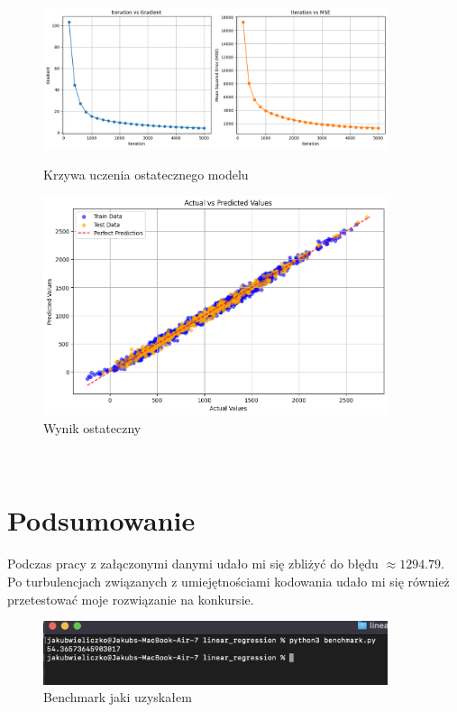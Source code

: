 \documentclass[polish,12pt,a4paper]{extarticle}
\begin{document}
\begin{figure}[h!]
    \centering
    \begin{minipage}[b]{0.48\textwidth}
    \includegraphics[width=0.9\textwidth]{data/finlc.png}
    \caption{Krzywa uczenia ostatecznego modelu}
    \end{minipage} \hspace{}
    \begin{minipage}[b]{0.48\textwidth}
    \includegraphics[width=0.9\textwidth]{data/finadjust.png}
    \caption{Wynik ostateczny}
    \end{minipage}
\end{figure} \\


\section*{Podsumowanie}
Podczas pracy z załączonymi danymi udało mi się zbliżyć do błędu $\approx 1294.79$. Po turbulencjach związanych z umiejętnościami kodowania udało mi się również przetestować moje rozwiązanie na konkursie.
\begin{figure}[h!]
    \includegraphics[width=0.9\textwidth]{data/benchmark.png}
    \caption{Benchmark jaki uzyskałem}
\end{figure} \\
\end{document}
